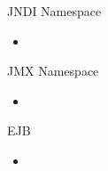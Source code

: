 \documentclass[hyperref={pdfauthor=\AUTHOR},14pt]{beamer}
\begin{document}
\begin{frame}{JNDI}
Namespace
\begin{itemize}
\item 
\end{itemize}
\end{frame}

\begin{frame}{JMX}
Namespace
\begin{itemize}
\item 
\end{itemize}
\end{frame}

\begin{frame}{EJB}
\begin{itemize}
\item 
\end{itemize}
\end{frame}


\end{document}
